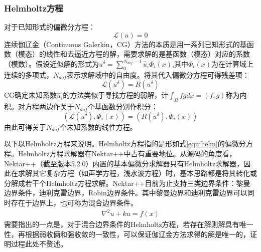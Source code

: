 \subsubsection{Helmholtz方程}
对于已知形式的偏微分方程：
$$\mathcal{L}(u) = 0$$
连续伽辽金（Continuous Galerkin，CG）方法的本质是用一系列已知形式的基函数（模态）的线性和去逼近方程的解，需要求解的是基函数（模态）对应的系数（模数）。假设近似解的形式为$u^{\delta} = \sum_{0}^{N_{dof}-1}\hat{u}_{i}\Phi_{i}(x)$,其中$\Phi_{i}(x)$为在计算域上连续的多项式，$N_{dof}$表示求解域中的自由度。将其代入偏微分方程可得残差项：
$$\mathcal{L}(u^{\delta}) = R(u^{\delta})$$
CG确定未知系数$\hat{u}_{i}$的方法类似于寻找方程的弱解，计$\int_{\Omega}fgdx = (f,g)$称为内积。对方程两边作关于$N_{dof}$个基函数分别作积分：
$$(\mathcal{L}(u^{\delta}),\Phi_{i}(x)) = (R(u^{\delta}),\Phi_{i}(x))$$
由此可得关于$N_{dof}$个未知系数的线性方程。

以下以Helmholtz方程来说明。Helmholtz方程指的是形如式\ref{equ:helm}的偏微分方程。Helmholtz方程求解器在Nektar++中占有重要地位。从源码的角度看，Nektar++（截至版本5.2.0）内置的基本偏微分求解器只有Helmholtz求解器，因此在求解其它复杂方程（如声学方程，浅水波方程）时，基本思路都是将其转化或分解成若干个Helmholtz方程求解。Nektar++目前为止支持三类边界条件：黎曼边界条件，迪利克雷边界，Robin边界条件。其中黎曼边界和迪利克雷边界可以同时存在于边界上，也可称为混合边界条件。
\begin{equation}
\begin{aligned}
	\nabla^2 u + ku = f(x)
\end{aligned}
\label{equ:helm}
\end{equation}
需要指出的一点是，对于混合边界条件的Helmholtz方程，若存在解则解具有唯一性，再根据弱收俩和强收敛的一致性，可以保证伽辽金方法求得的解是唯一的，证明过程此处不赘述。

